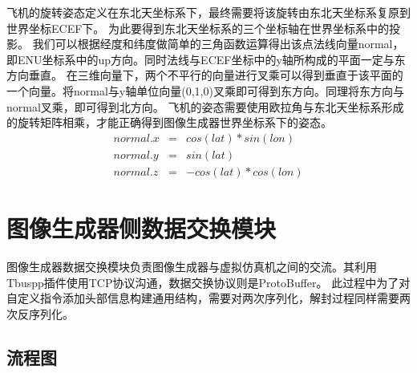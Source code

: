 \par
飞机的旋转姿态定义在东北天坐标系下，最终需要将该旋转由东北天坐标系复原到世界坐标ECEF下。
为此要得到东北天坐标系的三个坐标轴在世界坐标系中的投影。
我们可以根据经度和纬度做简单的三角函数运算得出该点法线向量normal，即ENU坐标系中的up方向。同时法线与ECEF坐标中的y轴所构成的平面一定与东方向垂直。
在三维向量下，两个不平行的向量进行叉乘可以得到垂直于该平面的一个向量。将normal与y轴单位向量(0,1,0)叉乘即可得到东方向。同理将东方向与normal叉乘，即可得到北方向。
飞机的姿态需要使用欧拉角与东北天坐标系形成的旋转矩阵相乘，才能正确得到图像生成器世界坐标系下的姿态。
\begin{eqnarray}    \label{eq}
    normal.x&=&cos(lat) * sin(lon)  \nonumber    \\
    normal.y&=&sin(lat) \nonumber    \\
    normal.z&=&-cos(lat) * cos(lon) \nonumber
\end{eqnarray}
\section{图像生成器侧数据交换模块}
图像生成器数据交换模块负责图像生成器与虚拟仿真机之间的交流。其利用Tbuspp插件使用TCP协议沟通，数据交换协议则是ProtoBuffer。
此过程中为了对自定义指令添加头部信息构建通用结构，需要对两次序列化，解封过程同样需要两次反序列化。
\subsection{流程图}

